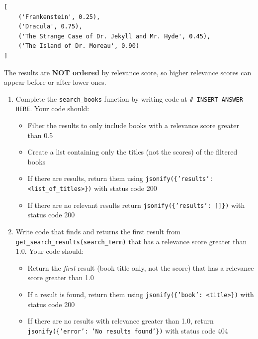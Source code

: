 \documentclass[11pt]{article}
\begin{document}
\begin{verbatim}
[
    ('Frankenstein', 0.25),
    ('Dracula', 0.75),
    ('The Strange Case of Dr. Jekyll and Mr. Hyde', 0.45), 
    ('The Island of Dr. Moreau', 0.90)
]
\end{verbatim}

\noindent The results are \textbf{NOT ordered} by relevance score, so higher relevance scores can appear before or after lower ones.

\begin{enumerate}[start=3]
\item Complete the \texttt{search\_books} function by writing code at \texttt{\# INSERT ANSWER HERE}. Your code should:

\begin{itemize}
    \item Filter the results to only include books with a relevance score greater than 0.5
    \item Create a list containing only the titles (not the scores) of the filtered books
    \item If there are results, return them using \texttt{jsonify(\{'results': <list\_of\_titles>\})} with status code 200
    \item If there are no relevant results return \texttt{jsonify(\{'results': []\})} with status code 200
\end{itemize}

\vspace{6cm}

\item Write code that finds and returns the first result from \texttt{get\_search\_results(search\_term)} that has a relevance score greater than 1.0. Your code should:

\begin{itemize}
    \item Return the {\it first} result (book title only, not the score) that has a relevance score greater than 1.0
    \item If a result is found, return them using \texttt{jsonify(\{'book': <title>\})} with status code 200
    \item If there are no results with relevance greater than 1.0, return \texttt{jsonify(\{'error': 'No results found'\})} with status code 404
\end{itemize}

\end{enumerate}
\end{document}
